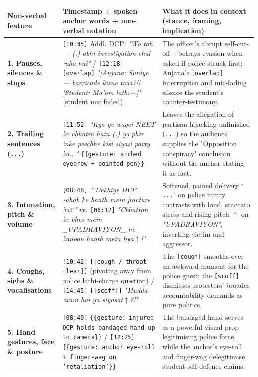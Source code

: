 \documentclass[10pt,a4paper]{article}
\begin{document}
\begin{longtable}{|p{}|p{}|p{}|}
\hline
Non-verbal feature & Timestamp + spoken anchor words + non-verbal notation & What it does in context (stance, framing, implication) \\ \hline \endhead
\textbf{1. Pauses, silences \& stops} & \texttt{[10:35]} Addl. DCP: \textit{"Wo toh--- (.) abhi investigation chal raha hai"} / \texttt{[12:18]} \texttt{[overlap]} \textit{"[Anjana: Suniye--- barricade kisne toda?!] [Student: Ma'am lathi---]"} (student mic faded) & The officer's abrupt self-cut-off \texttt{---} betrays evasion when asked if police struck first; Anjana's \texttt{[overlap]} interruption and mic-fading silence the student's counter-testimony. \\ \hline
\textbf{2. Trailing sentences (\texttt{...})} & \texttt{[11:52]} \textit{"Kya ye waqai NEET ke chhatra hain (.) ya phir inke peechhe kisi siyasi party ka..."} \texttt{\{\{gesture: arched eyebrow + pointed pen\}\}} & Leaves the allegation of partisan hijacking unfinished (\texttt{...}) so the audience supplies the "Opposition conspiracy" conclusion without the anchor stating it as fact. \\ \hline
\textbf{3. Intonation, pitch \& volume} & \texttt{[08:48]} \textit{"$^\circ$Dekhiye DCP sahab ke haath mein fracture hai$^\circ$"} vs. \texttt{[06:12]} \textit{"Chhatron ke bhes mein \_UPADRAVIYON\_ ne kanoon haath mein liya$\uparrow$!"} & Softened, pained delivery \texttt{$^\circ$...$^\circ$} on police injury contrasts with loud, staccato stress and rising pitch \texttt{$\uparrow$} on \textit{"UPADRAVIYON"}, inverting victim and aggressor. \\ \hline
\textbf{4. Coughs, sighs \& vocalisations} & \texttt{[10:42]} \texttt{[[cough / throat-clear]]} (pivoting away from police lathi-charge question) / \texttt{[14:45]} \texttt{[[scoff]]} \textit{"Mudda exam hai ya siyasat$\uparrow$?!"} & The \texttt{[cough]} smooths over an awkward moment for the police guest; the \texttt{[scoff]} dismisses protesters' broader accountability demands as pure politics. \\ \hline
\textbf{5. Hand gestures, face \& posture} & \texttt{[08:40]} \texttt{\{\{gesture: injured DCP holds bandaged hand up to camera\}\}} / \texttt{[12:25]} \texttt{\{\{gesture: anchor eye-roll + finger-wag on 'retaliation'\}\}} & The bandaged hand serves as a powerful visual prop legitimising police force, while the anchor's eye-roll and finger-wag delegitimise student self-defence claims. \\ \hline
\end{longtable}
\end{document}
